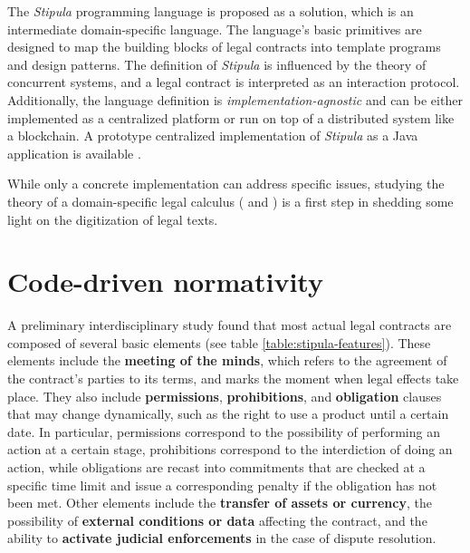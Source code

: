The \textit{Stipula} programming language is proposed as a solution, which is an intermediate 
domain-specific language. The language's basic primitives are designed to map the building blocks of legal 
contracts into template programs and design patterns. The definition of \textit{Stipula} is influenced by 
the theory of concurrent systems, and a legal contract is interpreted as an interaction protocol. 
Additionally, the language definition is \textit{implementation-agnostic} and can be either implemented as 
a centralized platform or run on top of a distributed system like a blockchain. A prototype centralized 
implementation of \textit{Stipula} as a Java application is available 
\autocite{site:stipula-java-centralized}.

While only a concrete implementation can address specific issues, studying the theory of a domain-specific 
legal calculus (\cite*{article:legal-calculi} and 
\cite{article:legally-enforceable-smart-contract-languages}) is a first step in shedding some light on the 
digitization of legal texts.

\section{Code-driven normativity}

A preliminary interdisciplinary study found that most actual legal contracts are composed of several basic 
elements (see table \ref{table:stipula-features}). These elements include the \textbf{meeting of the minds}, 
which refers to the agreement of the contract's parties to its terms, and marks the moment when legal 
effects take place. They also include \textbf{permissions}, \textbf{prohibitions}, and \textbf{obligation} 
clauses that may change dynamically, such as the right to use a product until a certain date. In 
particular, permissions correspond to the possibility of performing an action at a certain stage, 
prohibitions correspond to the interdiction of doing an action, while obligations are recast into 
commitments that are checked at a specific time limit and issue a corresponding penalty if the obligation 
has not been met. Other elements include the \textbf{transfer of assets or currency}, the possibility of 
\textbf{external conditions or data} affecting the contract, and the ability to 
\textbf{activate judicial enforcements} in the case of dispute resolution.

